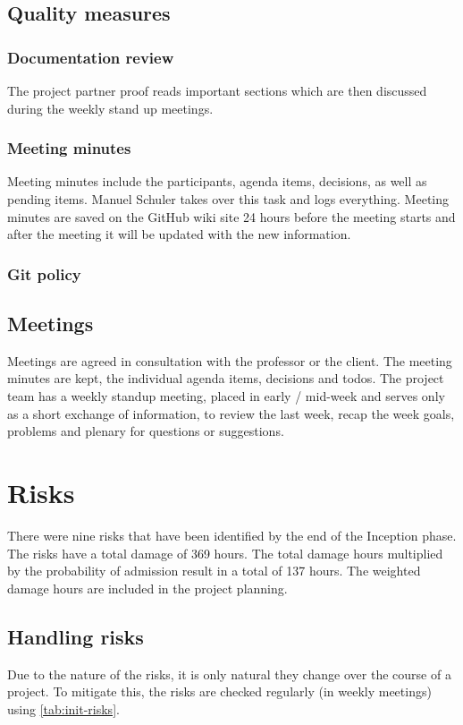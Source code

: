 \subsection{Quality measures}

\subsubsection{Documentation review}
The project partner proof reads important sections which are then discussed
during the weekly stand up meetings.


\subsubsection{Meeting minutes}
Meeting minutes include the participants, agenda items, decisions, as well as
pending items. Manuel Schuler takes over this task and logs everything.
Meeting minutes are saved on the GitHub wiki site 24 hours before the meeting
starts and after the meeting it will be updated with the new information.

\subsubsection{Git policy}


\subsection{Meetings}
Meetings are agreed in consultation with the professor or the client.
The meeting minutes are kept, the individual agenda items, decisions and todos.
The project team has a weekly standup meeting, placed in early / mid-week and
serves only as a short exchange of information, to review the last week, recap
the week goals, problems and plenary for questions or suggestions.


\section{Risks}
There were nine risks that have been identified by the end of the Inception phase.
The risks have a total damage of 369 hours. The total damage hours multiplied
by the probability of admission result in a total of 137 hours. The weighted damage
hours are included in the project planning.

\subsection{Handling risks}
Due to the nature of the risks, it is only natural they change over the course of a project.
To mitigate this, the risks are checked regularly (in weekly meetings) using \autoref{tab:init-risks}.

